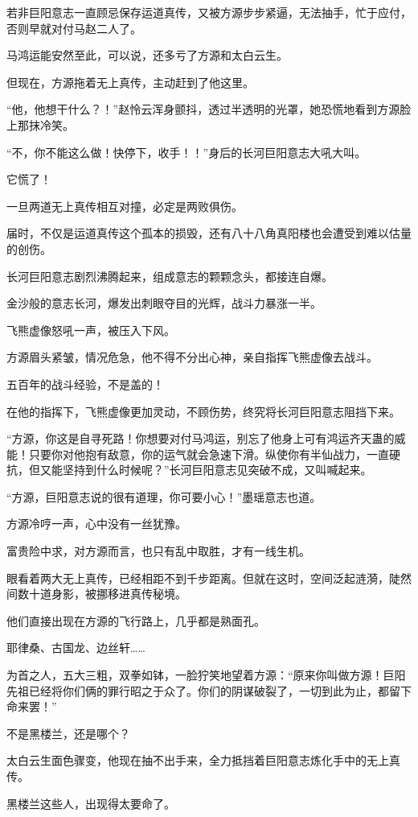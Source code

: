 \begin{this_body}
若非巨阳意志一直顾忌保存运道真传，又被方源步步紧逼，无法抽手，忙于应付，否则早就对付马赵二人了。

马鸿运能安然至此，可以说，还多亏了方源和太白云生。

但现在，方源拖着无上真传，主动赶到了他这里。

“他，他想干什么？！”赵怜云浑身颤抖，透过半透明的光罩，她恐慌地看到方源脸上那抹冷笑。

“不，你不能这么做！快停下，收手！！”身后的长河巨阳意志大吼大叫。

它慌了！

一旦两道无上真传相互对撞，必定是两败俱伤。

届时，不仅是运道真传这个孤本的损毁，还有八十八角真阳楼也会遭受到难以估量的创伤。

长河巨阳意志剧烈沸腾起来，组成意志的颗颗念头，都接连自爆。

金沙般的意志长河，爆发出刺眼夺目的光辉，战斗力暴涨一半。

飞熊虚像怒吼一声，被压入下风。

方源眉头紧皱，情况危急，他不得不分出心神，亲自指挥飞熊虚像去战斗。

五百年的战斗经验，不是盖的！

在他的指挥下，飞熊虚像更加灵动，不顾伤势，终究将长河巨阳意志阻挡下来。

“方源，你这是自寻死路！你想要对付马鸿运，别忘了他身上可有鸿运齐天蛊的威能！只要你对他抱有敌意，你的运气就会急速下滑。纵使你有半仙战力，一直硬抗，但又能坚持到什么时候呢？”长河巨阳意志见突破不成，又叫喊起来。

“方源，巨阳意志说的很有道理，你可要小心！”墨瑶意志也道。

方源冷哼一声，心中没有一丝犹豫。

富贵险中求，对方源而言，也只有乱中取胜，才有一线生机。

眼看着两大无上真传，已经相距不到千步距离。但就在这时，空间泛起涟漪，陡然间数十道身影，被挪移进真传秘境。

他们直接出现在方源的飞行路上，几乎都是熟面孔。

耶律桑、古国龙、边丝轩……

为首之人，五大三粗，双拳如钵，一脸狞笑地望着方源：“原来你叫做方源！巨阳先祖已经将你们俩的罪行昭之于众了。你们的阴谋破裂了，一切到此为止，都留下命来罢！”

不是黑楼兰，还是哪个？

太白云生面色骤变，他现在抽不出手来，全力抵挡着巨阳意志炼化手中的无上真传。

黑楼兰这些人，出现得太要命了。


\end{this_body}
